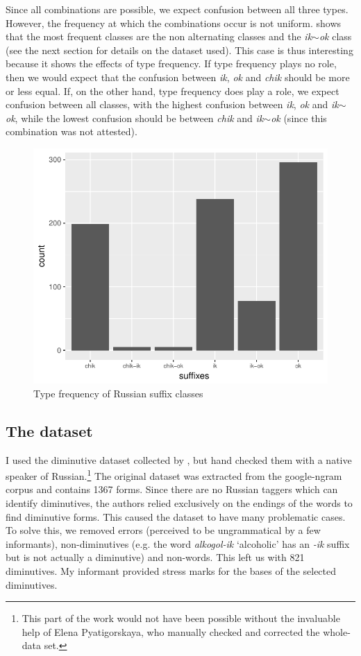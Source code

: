 Since all combinations are possible, we expect confusion between all three types. However, the frequency at which the combinations occur is not uniform.  shows that the most frequent classes are the non alternating classes and the \textit{ik$\sim$ok} class (see the next section for details on the dataset used). This case is thus interesting because it shows the effects of type frequency. If type frequency plays no role, then we would expect that the confusion between \textit{ik}, \textit{ok} and \textit{chik} should be more or less equal. If, on the other hand, type frequency does play a role, we expect confusion between all classes, with the highest confusion between \textit{ik}, \textit{ok} and \textit{ik$\sim$ok}, while the lowest confusion should be between \textit{chik} and \textit{ik$\sim$ok} (since this combination was not attested).

\begin{figure}
  \centering
  \includegraphics[scale=0.7]{./figures/russian/suffixes}
  \caption{Type frequency of Russian suffix classes}\label{fig:freqs-russ-dims}
\end{figure}

\subsection{The dataset}
\largerpage
I used the diminutive dataset collected by \textcite{Gouskova.2015}, but hand checked them with a native speaker of Russian.\footnote{This part of the work would not have been possible without the invaluable help of Elena Pyatigorskaya, who manually checked and corrected the whole-data set.} The original dataset was extracted from the google-ngram corpus \autocite{Michel.2011} and contains 1367 forms. Since there are no Russian taggers which can identify diminutives, the authors relied exclusively on the endings of the words to find diminutive forms. This caused the dataset to have many problematic cases. To solve this, we removed errors (perceived to be ungrammatical by a few informants), non-diminutives (e.g. the word \textit{alkogol-ik} `alcoholic' has an \textit{-ik} suffix but is not actually a diminutive) and non-words. This left us with 821 diminutives. My informant provided stress marks for the bases of the selected diminutives.

